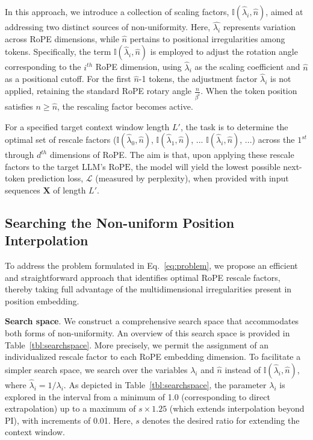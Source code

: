 In this approach, we introduce a collection of scaling factors, $\mathbb{I}(\hat{\lambda}_{i},\hat{n})$, aimed at addressing two distinct sources of non-uniformity. Here, $\hat{\lambda_i}$ represents variation across RoPE dimensions, while $\hat{n}$ pertains to positional irregularities among tokens. Specifically, the term $\mathbb{I}(\hat{\lambda}_{i},\hat{n})$ is employed to adjust the rotation angle corresponding to the $i^{th}$ RoPE dimension, using $\hat\lambda_{i}$ as the scaling coefficient and $\hat{n}$ as a positional cutoff. For the first $\hat{n}$-1 tokens, the adjustment factor $\hat\lambda_{i}$ is not applied, retaining the standard RoPE rotary angle $\frac{n}{\beta^i}$. When the token position satisfies $n\ge\hat{n}$, the rescaling factor becomes active.

For a specified target context window length $L'$, the task is to determine the optimal set of rescale factors ($\mathbb{I}(\hat{\lambda}_{0},\hat{n})$, $\mathbb{I}(\hat{\lambda}_{1},\hat{n})$, ... $\mathbb{I}(\hat{\lambda}_{i},\hat{n})$, ...) across the $1^{st}$ through $d^{th}$ dimensions of RoPE. The aim is that, upon applying these rescale factors to the target $\text{LLM}$'s $\text{RoPE}$, the model will yield the lowest possible next-token prediction loss, $\mathcal{L}$ (measured by perplexity), when provided with input sequences $\mathbf{X}$ of length $L'$.

\subsection{Searching the Non-uniform Position Interpolation}

To address the problem formulated in Eq.~\ref{eq:problem}, we propose an efficient and straightforward approach that identifies optimal RoPE rescale factors, thereby taking full advantage of the multidimensional irregularities present in position embedding.

\textbf{Search space}. We construct a comprehensive search space that accommodates both forms of non-uniformity. An overview of this search space is provided in Table~\ref{tbl:searchspace}. More precisely, we permit the assignment of an individualized rescale factor to each RoPE embedding dimension. To facilitate a simpler search space, we search over the variables $\lambda_i$ and $\hat{n}$ instead of $\mathbb{I}(\hat{\lambda}_{i},\hat{n})$, where  $\hat{\lambda}_{i}=1/\lambda_i$. 
As depicted in Table~\ref{tbl:searchspace}, the parameter $\lambda_i$ is explored in the interval from a minimum of 1.0 (corresponding to direct extrapolation) up to a maximum of $s\times1.25$ (which extends interpolation beyond PI), with increments of 0.01. Here, $s$ denotes the desired ratio for extending the context window.


